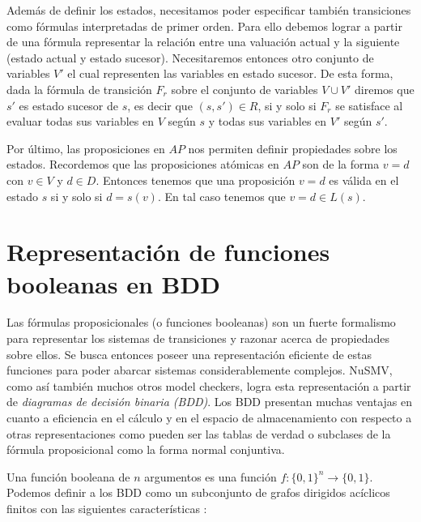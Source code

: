 \documentclass[pdftex,a4paper,12pt]{book}
\begin{document}
Adem\'as de definir los estados, necesitamos poder especificar tambi\'en transiciones como f\'ormulas interpretadas de primer orden. Para ello debemos lograr a partir de una f\'ormula representar la relaci\'on entre una valuaci\'on actual y la siguiente (estado actual y estado sucesor). Necesitaremos entonces otro conjunto de variables $V'$ el cual representen las variables en estado sucesor. De esta forma, dada la f\'ormula de transici\'on $F_r$ sobre el conjunto de variables $V \cup V'$ diremos que $s'$ es estado sucesor de $s$, es decir que $(s,s')\in R$, si y solo si $F_r$ se satisface al evaluar todas sus variables en $V$ seg\'un $s$ y todas sus variables en $V'$ seg\'un $s'$.

Por \'ultimo, las proposiciones en $AP$ nos permiten definir propiedades sobre los estados. Recordemos que las proposiciones at\'omicas en $AP$ son de la forma $v=d$ con $v \in V$ y $d \in D$. Entonces tenemos que una proposici\'on $v=d$ es v\'alida en el estado $s$ si y solo si $d = s(v)$. En tal caso tenemos que $v=d \in L(s)$.








\section{Representaci\'on de funciones booleanas en BDD}
\label{boolBDD}

Las f\'ormulas proposicionales (o funciones booleanas) son un fuerte formalismo para representar los sistemas de transiciones y razonar acerca de propiedades sobre ellos. Se busca entonces poseer una representaci\'on eficiente de estas funciones para poder abarcar sistemas considerablemente complejos. NuSMV, como as\'i tambi\'en muchos otros model checkers, logra esta representaci\'on a partir de \textit{diagramas de decisi\'on binaria (BDD)}. Los BDD presentan muchas ventajas en cuanto a eficiencia en el c\'alculo y en el espacio de almacenamiento con respecto a otras representaciones como pueden ser las tablas de verdad o subclases de la f\'ormula proposicional como la forma normal conjuntiva.

Una funci\'on booleana de $n$ argumentos es una funci\'on $f : \{0,1\}^n \to \{0,1\}$. Podemos definir a los BDD como un subconjunto de grafos dirigidos ac\'iclicos finitos con las siguientes caracter\'isticas \cite{Huth}:
\end{document}
